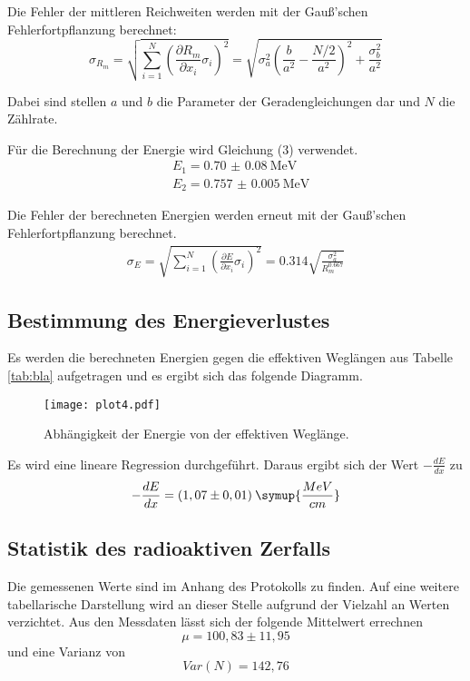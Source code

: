 Die Fehler der mittleren Reichweiten werden mit der Gauß'schen Fehlerfortpflanzung berechnet:
\begin{equation}
  \sigma_{R_m} = \sqrt{
      \sum\limits_{i = 1}^N
       \left( \frac{\partial R_m}{\partial x_i} \sigma_i \right)^{\!\! 2}
     } = \sqrt{\sigma_{a}^{2} \left(\frac{b}{a^{2}} - \frac{N/2}{a^{2}}\right)^{2} + \frac{\sigma_{b}^{2}}{a^{2}} }
\end{equation}

Dabei sind stellen $a$ und $b$ die Parameter der Geradengleichungen dar und $N$ die Zählrate.

Für die Berechnung der Energie wird Gleichung (3) verwendet.
\begin{align*}
  &E_1 = \SI{0.70(8)}{\mega\eV} \\
  &E_2 = \SI{0.757(5)}{\mega\eV}
\end{align*}

Die Fehler der berechneten Energien werden erneut mit der Gauß'schen Fehlerfortpflanzung berechnet.
\begin{align*}
  \sigma_{E} = \sqrt{
      \sum\limits_{i = 1}^N
       \left( \frac{\partial E}{\partial x_i} \sigma_i \right)^{\!\! 2}
     } = 0.314 \sqrt{\frac{\sigma_{a}^{2}}{R_m^{0.667}}}
\end{align*}


\subsection{Bestimmung des Energieverlustes}
Es werden die berechneten Energien gegen die effektiven Weglängen aus Tabelle \ref{tab:bla} aufgetragen und es ergibt sich das folgende Diagramm.
\begin{figure}[H]
  \centering
  \texttt{[image: plot4.pdf]}
  \caption{Abhängigkeit der Energie von der effektiven Weglänge.}
  \label{fig:plot4}
\end{figure}
Es wird eine lineare Regression durchgeführt. Daraus ergibt sich der Wert $-\frac{dE}{dx}$ zu
\begin{equation*}
  -\frac{dE}{dx} = (1,07 \pm 0,01) \: \symup{\frac{MeV}{cm}}
\end{equation*}

\subsection{Statistik des radioaktiven Zerfalls}
Die gemessenen Werte sind im Anhang des Protokolls zu finden. Auf eine weitere tabellarische
Darstellung wird an dieser Stelle aufgrund der Vielzahl an Werten verzichtet.
Aus den Messdaten lässt sich der folgende Mittelwert errechnen
\begin{equation*}
  \mu = 100,83 \pm 11,95
\end{equation*}
und eine Varianz von
\begin{equation*}
  Var(N) = 142,76
\end{equation*}

